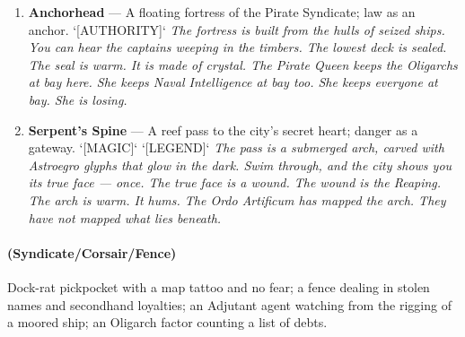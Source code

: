 \begin{enumerate}
\item[K] \textbf{Anchorhead} --- A floating fortress of the Pirate Syndicate; law as an anchor. `[AUTHORITY]`
  \hfill \textit{The fortress is built from the hulls of seized ships. You can hear the captains weeping in the timbers. The lowest deck is sealed. The seal is warm. It is made of crystal. The Pirate Queen keeps the Oligarchs at bay here. She keeps Naval Intelligence at bay too. She keeps everyone at bay. She is losing.}
\item[A] \textbf{Serpent's Spine} --- A reef pass to the city's secret heart; danger as a gateway. `[MAGIC]` `[LEGEND]`
  \hfill \textit{The pass is a submerged arch, carved with Astroegro glyphs that glow in the dark. Swim through, and the city shows you its true face --- once. The true face is a wound. The wound is the Reaping. The arch is warm. It hums. The Ordo Artificum has mapped the arch. They have not mapped what lies beneath.}
\end{enumerate}

\paragraph*{(Syndicate/Corsair/Fence)} Dock-rat pickpocket with a map tattoo and no fear; a fence dealing in stolen names and secondhand loyalties; an Adjutant agent watching from the rigging of a moored ship; an Oligarch factor counting a list of debts.

